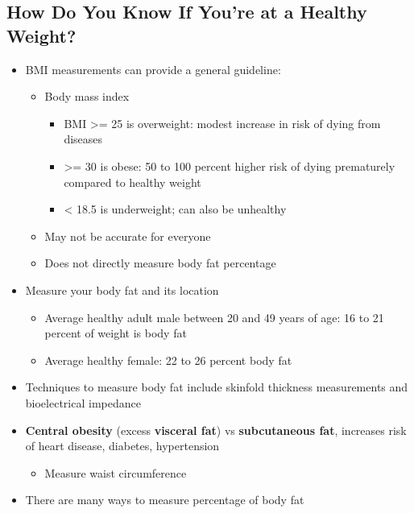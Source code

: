 \documentclass[12pt]{article}
\begin{document}
        \subsection{How Do You Know If You're at a Healthy Weight?}
            \begin{itemize}
                \item BMI measurements can provide a general guideline:
                    \begin{itemize}
                        \item Body mass index %
                            \begin{itemize}
                                \item BMI >= 25 is overweight: modest increase in risk of dying from diseases
                                \item >= 30 is obese: 50 to 100 percent higher risk of dying prematurely compared to healthy weight
                                \item < 18.5 is underweight; can also be unhealthy
                            \end{itemize}
                        \item May not be accurate for everyone
                        \item Does not directly measure body fat percentage
                    \end{itemize}
                \item Measure your body fat and its location
                    \begin{itemize}
                        \item Average healthy adult male between 20 and 49 years of age: 16 to 21 percent of weight is body fat
                        \item Average healthy female: 22 to 26 percent body fat
                    \end{itemize}
                \item Techniques to measure body fat include skinfold thickness measurements and bioelectrical impedance
                \item \textbf{Central obesity} (excess \textbf{visceral fat}) vs \textbf{subcutaneous fat}, increases risk of heart disease, diabetes, hypertension
                    \begin{itemize}
                        \item Measure waist circumference
                    \end{itemize}
                \item There are many ways to measure percentage of body fat
            \end{itemize}
        
\end{document}
